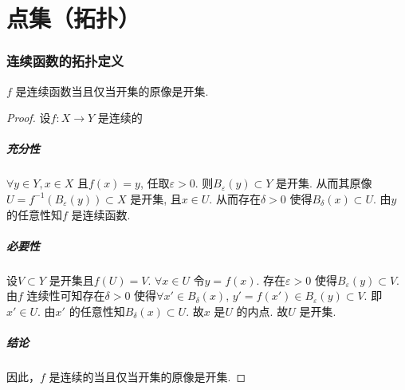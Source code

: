 \chapter{点集（拓扑）}
\subsection{连续函数的拓扑定义}
\begin{definition}
    \(f\) 是连续函数当且仅当开集的原像是开集.
\end{definition}

\begin{proof}
    设\(f: X\to Y\) 是连续的
    \paragraph{充分性}
    \(\forall y \in Y, x \in X\) 且\(f(x)=y\),
    任取\(\varepsilon >0\). 则\(B_{\varepsilon}(y) \subset Y\)
    是开集. 从而其原像\(U=f^{-1}\left( B_{\varepsilon}(y)
    \right)\subset X\) 是开集, 且\(x \in U\). 从而存在\(\delta >0\)
    使得\(B_{\delta}(x) \subset U\). 由\(y\) 的任意性知\(f\) 是连续函数.
    \paragraph{必要性}
    设\(V \subset Y\) 是开集且\(f(U)=V\). \(\forall x \in U\) 令\(y=f(x)\).
    存在\(\varepsilon >0\) 使得\(B_{\varepsilon}(y) \subset
    V\). 由\(f\) 连续性可知存在\(\delta >0\) 使得\(\forall x' \in
    B_{\delta}(x)\), \(y'=f(x')\in B_{\varepsilon}(y)
    \subset V\). 即\(x' \in U\). 由\(x'\)
    的任意性知\(B_{\delta}(x) \subset U\). 故\(x\) 是\(U\) 的内点. 故\(U\) 是开集.
    \paragraph{结论}
    因此，\(f\) 是连续的当且仅当开集的原像是开集.
\end{proof}

